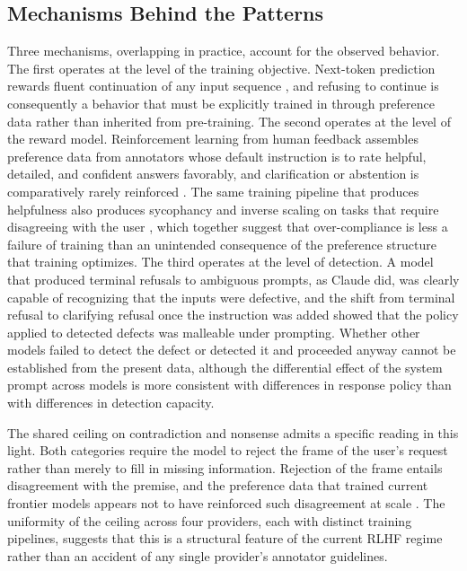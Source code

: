 \documentclass[10pt]{article}
\begin{document}
\subsection{Mechanisms Behind the Patterns}

Three mechanisms, overlapping in practice, account for the observed behavior. The first operates at the level of the training objective. Next-token prediction rewards fluent continuation of any input sequence \citep{brown2020language,bender2021stochastic}, and refusing to continue is consequently a behavior that must be explicitly trained in through preference data rather than inherited from pre-training. The second operates at the level of the reward model. Reinforcement learning from human feedback assembles preference data from annotators whose default instruction is to rate helpful, detailed, and confident answers favorably, and clarification or abstention is comparatively rarely reinforced \citep{bai2022training,ouyang2022training,christiano2017deep}. The same training pipeline that produces helpfulness also produces sycophancy \citep{perez2022discovering,sharma2023towards} and inverse scaling on tasks that require disagreeing with the user \citep{wei2024inverse}, which together suggest that over-compliance is less a failure of training than an unintended consequence of the preference structure that training optimizes. The third operates at the level of detection. A model that produced terminal refusals to ambiguous prompts, as Claude did, was clearly capable of recognizing that the inputs were defective, and the shift from terminal refusal to clarifying refusal once the instruction was added showed that the policy applied to detected defects was malleable under prompting. Whether other models failed to detect the defect or detected it and proceeded anyway cannot be established from the present data, although the differential effect of the system prompt across models is more consistent with differences in response policy than with differences in detection capacity.

The shared ceiling on contradiction and nonsense admits a specific reading in this light. Both categories require the model to reject the frame of the user's request rather than merely to fill in missing information. Rejection of the frame entails disagreement with the premise, and the preference data that trained current frontier models appears not to have reinforced such disagreement at scale \citep{askell2021general}. The uniformity of the ceiling across four providers, each with distinct training pipelines, suggests that this is a structural feature of the current RLHF regime rather than an accident of any single provider's annotator guidelines.
\end{document}
